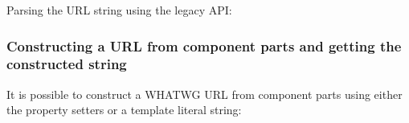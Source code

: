 Parsing the URL string using the legacy API:

\begin{Shaded}
\begin{Highlighting}[]
 \OperatorTok{;}
\OperatorTok{=}
\NormalTok{(}\NormalTok{)}\OperatorTok{;}
\end{Highlighting}
\end{Shaded}

\begin{Shaded}
\begin{Highlighting}[]
\OperatorTok{=} \NormalTok{(}\NormalTok{)}\OperatorTok{;}
\OperatorTok{=}
\NormalTok{(}\NormalTok{)}\OperatorTok{;}
\end{Highlighting}
\end{Shaded}

\subsubsection{Constructing a URL from component parts and getting the
constructed
string}\label{constructing-a-url-from-component-parts-and-getting-the-constructed-string}

It is possible to construct a WHATWG URL from component parts using
either the property setters or a template literal string:

\begin{Shaded}
\begin{Highlighting}[]
\OperatorTok{=}  \NormalTok{(}\NormalTok{)}\OperatorTok{;}
 \OperatorTok{=} \OperatorTok{;}
 \OperatorTok{=} \OperatorTok{;}
 \OperatorTok{=} \OperatorTok{;}
\end{Highlighting}
\end{Shaded}

